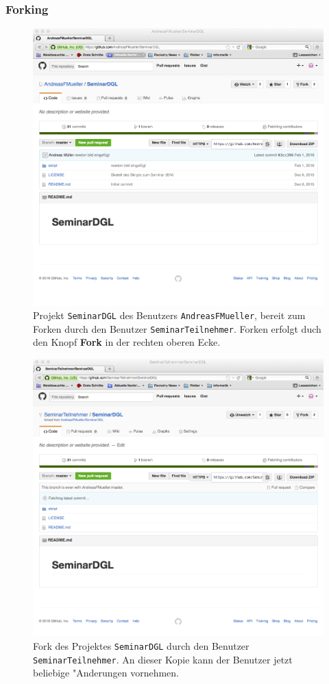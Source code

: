 \documentclass[a4paper,12pt]{article}
\begin{document}
\subsubsection{Forking}
\begin{figure}
\centering
\includegraphics[width=\hsize]{fork.png}
\caption{Projekt \texttt{SeminarDGL} des Benutzers \texttt{AndreasFMueller},
bereit zum Forken durch den Benutzer \texttt{SeminarTeilnehmer}.
Forken erfolgt duch den Knopf {\bf Fork} in der rechten oberen Ecke.
\label{fork}}
\end{figure}
\begin{figure}
\centering
\includegraphics[width=\hsize]{forked.png}
\caption{Fork des Projektes \texttt{SeminarDGL} durch den Benutzer
\texttt{SeminarTeilnehmer}.
An dieser Kopie kann der Benutzer jetzt beliebige "Anderungen vornehmen.
\label{forked}}
\end{figure}
\end{document}
